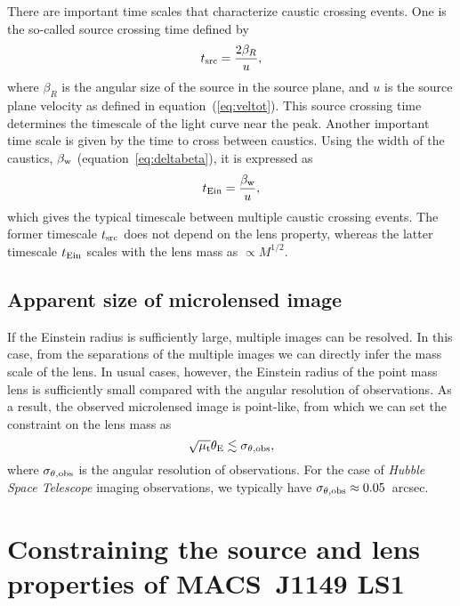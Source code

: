 \documentclass[showpacs,twocolumn,preprintnumbers,amsmath,amssymb,superscriptaddress,nofootinbib]{revtex4}
\begin{document}
There are important time scales that characterize caustic crossing
events. One is the so-called source crossing time defined by
\begin{equation}
  t_{\rm src}=\frac{2\beta_R}{u},
\label{eq:tsrc}
\end{equation}
where $\beta_R$ is the angular size of the source in the source plane,
and $u$ is the source plane velocity as defined in
equation~(\ref{eq:veltot}). This source crossing time determines the 
timescale of the light curve near the peak. Another important time
scale is given by the time to cross between caustics. Using the width
of the caustics, $\beta_{\rm w}$ (equation~\ref{eq:deltabeta}), it is
expressed as 
\begin{equation}
  t_{\rm Ein}=\frac{\beta_{\rm w}}{u},
\label{eq:tein}
\end{equation}
which gives the typical timescale between multiple caustic crossing
events. The former timescale $t_{\rm src}$ does not depend on the lens
property, whereas the latter timescale $t_{\rm Ein}$ scales with the
lens mass as $\propto M^{1/2}$.

\subsection{Apparent size of microlensed image}

If the Einstein radius is sufficiently large, multiple images can be
resolved. In this case, from the separations of the multiple images we
can directly infer the mass scale of the lens. In usual cases,
however, the Einstein radius of the point mass lens is sufficiently
small compared with the angular resolution of observations. As a
result, the observed microlensed image is point-like, from which we can
set the constraint on the lens mass as
\begin{equation}
\sqrt{\mu_{\rm t}}\theta_{\rm E}\lesssim \sigma_{\theta,{\rm obs}},
\label{eq:appsiz}
\end{equation}
where $\sigma_{\theta,{\rm obs}}$ is the angular resolution of
observations. For the case of {\it Hubble Space Telescope} imaging
observations, we typically have $\sigma_{\theta,{\rm obs}}\approx
0.05$~arcsec. 

\section{Constraining the source and lens properties of MACS~J1149 LS1}
\label{sec:constraint}
\end{document}
